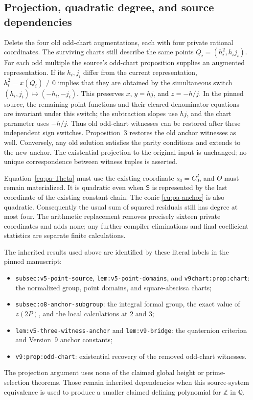 \subsection{Projection, quadratic degree, and source dependencies}

Delete the four old odd-chart augmentations, each with four private
rational coordinates.  The surviving charts still describe the same
points $Q_i=(h_i^2,h_ij_i)$.  For each odd multiple the source's odd-chart
proposition supplies an augmented representation.  If its $h_i,j_i$
differ from the current representation, $h_i^2=x(Q_i)\ne0$ implies
that they are obtained by the simultaneous switch
$(h_i,j_i)\mapsto(-h_i,-j_i)$.  This preserves $x$, $y=hj$, and
$z=-h/j$.  In the pinned source, the remaining point functions and their
cleared-denominator equations are invariant under this switch; the
subtraction slopes use $hj$, and the chart parameter uses $-h/j$.
Thus old odd-chart witnesses can be restored after these independent
sign switches.  Proposition~3 restores the old anchor witnesses as
well.  Conversely, any old solution satisfies the parity conditions
and extends to the new anchor.  The existential projection to the
original input is unchanged; no unique correspondence between witness
tuples is asserted.

Equation~\eqref{eq:pa-Theta} must use the existing coordinate
$s_0=C_0^2$, and $\Theta$ must remain materialized.  It is quadratic
even when $\mathsf S$ is represented by the last coordinate of the
existing constant chain.  The conic \eqref{eq:pa-anchor} is also
quadratic.  Consequently the usual sum of squared residuals still has
degree at most four.  The arithmetic replacement removes precisely
sixteen private coordinates and adds none; any further compiler
eliminations and final coefficient statistics are separate finite
calculations.

The inherited results used above are identified by these literal
labels in the pinned manuscript:
\begin{itemize}
 \item \texttt{subsec:v5-point-source}, \texttt{lem:v5-point-domains},
 and \texttt{v9chart:prop:chart}: the normalized group, point domains,
 and square-abscissa charts;
 \item \texttt{subsec:o8-anchor-subgroup}: the integral formal group,
 the exact value of $z(2P)$, and the local calculations at $2$ and $3$;
 \item \texttt{lem:v5-three-witness-anchor} and
 \texttt{lem:v9-bridge}: the quaternion criterion and Version~9
 anchor constants;
 \item \texttt{v9:prop:odd-chart}: existential recovery of the removed
 odd-chart witnesses.
\end{itemize}
The projection argument uses none of the claimed global height or
prime-selection theorems.  Those remain inherited dependencies when
this source-system equivalence is used to produce a smaller claimed
defining polynomial for $\mathbb Z$ in $\mathbb Q$.
